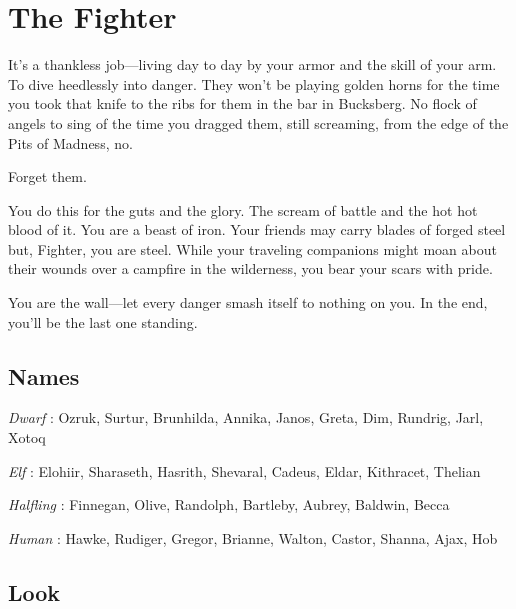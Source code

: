 \chapter{The Fighter}
  
 





It’s a thankless job—living day to day by your armor and the skill of your arm. To dive heedlessly into danger. They won’t be playing golden horns for the time you took that knife to the ribs for them in the bar in Bucksberg. No flock of angels to sing of the time you dragged them, still screaming, from the edge of the Pits of Madness, no.

 

Forget them.

 

You do this for the guts and the glory. The scream of battle and the hot hot blood of it. You are a beast of iron. Your friends may carry blades of forged steel but, Fighter, you are steel. While your traveling companions might moan about their wounds over a campfire in the wilderness, you bear your scars with pride.

 

You are the wall—let every danger smash itself to nothing on you. In the end, you’ll be the last one standing.



 
\section{Names}   
 



{\em Dwarf} : Ozruk, Surtur, Brunhilda, Annika, Janos, Greta, Dim, Rundrig, Jarl, Xotoq

   

{\em Elf} : Elohiir, Sharaseth, Hasrith, Shevaral, Cadeus, Eldar, Kithracet, Thelian

     

{\em Halfling} : Finnegan, Olive, Randolph, Bartleby, Aubrey, Baldwin, Becca

  

{\em Human} : Hawke, Rudiger, Gregor, Brianne, Walton, Castor, Shanna, Ajax, Hob



 
\section{Look}  
 



